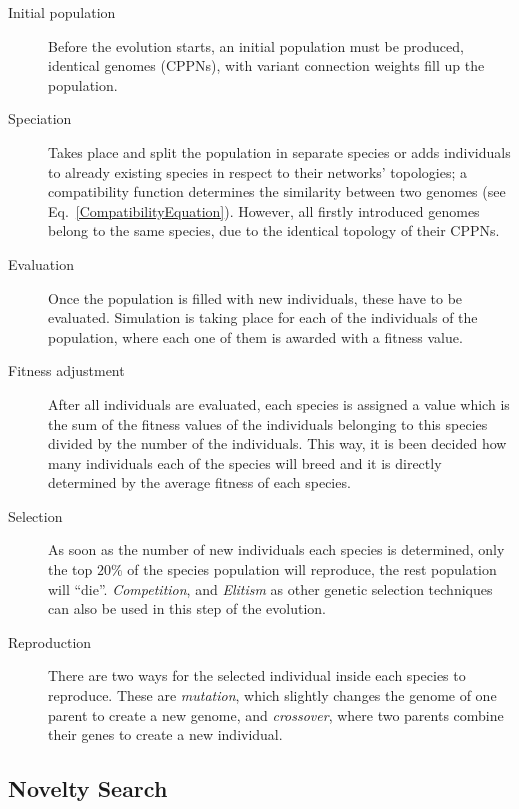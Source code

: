 \begin{description}
\item[Initial population]{Before the evolution starts, an initial population must be produced, identical genomes (CPPNs), with variant connection weights fill up the population.}

\item[Speciation]{Takes place and split the population in separate species or adds individuals to already existing species in respect to their networks' topologies; a compatibility function determines the similarity between two genomes (see Eq.~\ref{CompatibilityEquation}). However, all firstly introduced genomes belong to the same species, due to the identical topology of their CPPNs.}

\item[Evaluation] Once the population is filled with new individuals, these have to be evaluated. Simulation is taking place for each of the individuals of the population, where each one of them is awarded with a fitness value.

\item[Fitness adjustment]{After all individuals are evaluated, each species is assigned a value which is the sum of the fitness values of the individuals belonging to this species divided by the number of the individuals. This way, it is been decided how many individuals each of the species will breed and it is directly determined by the average fitness of each species.}

\item[Selection]{As soon as the number of new individuals each species is determined, only the top $20\%$ of the species population will reproduce, the rest population will ``die''. \emph{Competition}, and \emph{Elitism} as other genetic selection techniques can also be used in this step of the evolution.}

\item[Reproduction]{There are two ways for the selected individual inside each species to reproduce. These are \emph{mutation}, which slightly changes the genome of one parent to create a new genome, and \emph{crossover}, where two parents combine their genes to create a new individual.}
\end{description}






\subsection{Novelty Search}

